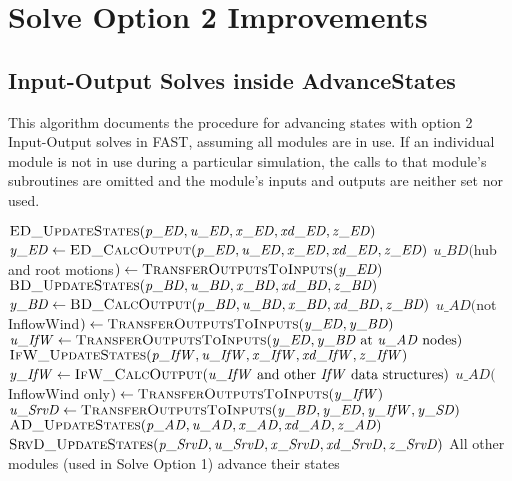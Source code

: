\documentclass[10pt,letterpaper,oneside,notitlepage]{article}
\begin{document}
\pagebreak %
\section{Solve Option 2 Improvements}
\subsection {Input-Output Solves inside AdvanceStates}
This algorithm documents the procedure for advancing states with option 2 
Input-Output solves in FAST, assuming
all modules are in use. If an individual module is not in use during a particular
simulation, the calls to that module's subroutines are omitted and the module's 
inputs and outputs are neither set nor used.

\begin{algorithmic}[1]
\State $\Call{ED\_UpdateStates}{\mathit{p\_ED},\mathit{u\_ED},\mathit{x\_ED},\mathit{xd\_ED},\mathit{z\_ED}}$
\State $\mathit{y\_ED} \gets \Call{ED\_CalcOutput}{\mathit{p\_ED},\mathit{u\_ED},\mathit{x\_ED},\mathit{xd\_ED},\mathit{z\_ED}}$
\State
\State $\mathit{u\_BD}($hub and root motions$) \gets \Call{TransferOutputsToInputs}{\mathit{y\_ED}}$
\State $\Call{BD\_UpdateStates}{\mathit{p\_BD},\mathit{u\_BD},\mathit{x\_BD},\mathit{xd\_BD},\mathit{z\_BD}}$
\State $\mathit{y\_BD} \gets \Call{BD\_CalcOutput}{\mathit{p\_BD},\mathit{u\_BD},\mathit{x\_BD},\mathit{xd\_BD},\mathit{z\_BD}}$
\State
\State $\mathit{u\_AD}($not InflowWind$) \gets \Call{TransferOutputsToInputs}{\mathit{y\_ED},\mathit{y\_BD}}$
\State $\mathit{u\_IfW} \gets \Call{TransferOutputsToInputs}{\mathit{y\_ED},\mathit{y\_BD}$ at $\mathit{u\_AD}$ nodes$}$
\State $\Call{IfW\_UpdateStates}{\mathit{p\_IfW},\mathit{u\_IfW},\mathit{x\_IfW},\mathit{xd\_IfW},\mathit{z\_IfW}}$
\State $\mathit{y\_IfW} \gets \Call{IfW\_CalcOutput}{\mathit{u\_IfW}$ and other $\mathit{IfW}$ data structures$}$
\State
\State $\mathit{u\_AD}($InflowWind only$) \gets \Call{TransferOutputsToInputs}{\mathit{y\_IfW}}$
\State $\mathit{u\_SrvD} \gets \Call{TransferOutputsToInputs}{\mathit{y\_BD},\mathit{y\_ED},\mathit{y\_IfW},\mathit{y\_SD}}$
\State $\Call{AD\_UpdateStates}{\mathit{p\_AD},\mathit{u\_AD},\mathit{x\_AD},\mathit{xd\_AD},\mathit{z\_AD}}$
\State $\Call{SrvD\_UpdateStates}{\mathit{p\_SrvD},\mathit{u\_SrvD},\mathit{x\_SrvD},\mathit{xd\_SrvD},\mathit{z\_SrvD}}$
\State
\State All other modules (used in Solve Option 1) advance their states
\EndProcedure
\end{algorithmic}
\end{document}
